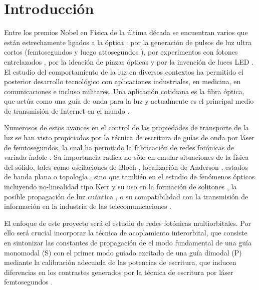 \chapter{Introducción}
Entre los premios Nobel en Física de la última década se encuentran varios que están estrechamente ligados a la óptica \cite{nobel}: por la generación de pulsos de luz ultra cortos (femtosegundos \cite{femto1} y luego attosegundos \cite{atto1, atto2, atto3}), por experimentos con fotones entrelazados \cite{photons1, photons2, photons3}, por la ideación de pinzas ópticas \cite{opticaltweezers} y por la invención de luces LED \cite{led1, led2, led3}. El estudio del comportamiento de la luz en diversos contextos ha permitido el posterior desarrollo tecnológico con aplicaciones industriales, en medicina, en comunicaciones e incluso militares. Una aplicación cotidiana es la fibra óptica, que actúa como una guía de onda para la luz y actualmente es el principal medio de transmisión de Internet en el mundo \cite{fibra2, fibra}. 
	
	Numerosos de estos avances en el control de las propiedades de transporte de la luz se han visto propiciados por la técnica de escritura de guías de onda por láser de femtosegundos, la cual ha permitido la fabricación de redes fotónicas de variada índole \cite{femto, bics, lieb1, lieb2, artificialFB, FBdynamics, strain, dendritas, splitters}. Su importancia radica no sólo en emular situaciones de la física del sólido, tales como oscilaciones de Bloch \cite{BlochOsci}, localización de Anderson \cite{Anderson}, estados de banda plana \cite{lieb1, lieb2, artificialFB, FBdynamics} o topología \cite{obstopo, obsfloquet, topo1dphoto,toporusos}, sino que también en el estudio de fenómenos ópticos incluyendo no-linealidad tipo Kerr y su uso en la formación de solitones \cite{discretesolitons}, la posible propagación de luz cuántica \cite{qed, squeezed, topoquantum}, o su compatibilidad con la transmisión de información en la industria de las telecomunicaciones \cite{telecom}.
	
	El enfoque de este proyecto será el estudio de redes fotónicas multiorbitales. Por ello será crucial incorporar la técnica de acoplamiento interorbital, que consiste en sintonizar las constantes de propagación de el modo fundamental de una guía monomodal (S) con el primer modo guiado excitado de una guía dimodal (P) mediante la calibración adecuada de las potencias de escritura, que inducen diferencias en los contrastes generados por la técnica de escritura por láser femtosegundos \cite{interorbital}.
	
